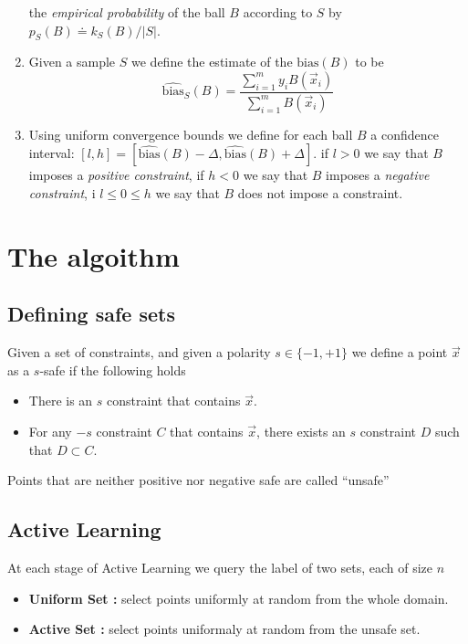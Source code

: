 \documentclass{article}
\newcommand{\x}{\vec{x}}
\newcommand{\bias}{\text{bias}}
\newcommand{\ebias}{\widehat{\text{bias}}}
\newcommand{\samp}{S}
\begin{document}
\begin{enumerate}
    the {\em empirical probability} of the ball $B$ according to
    $\samp$ by $p_{\samp}(B) \doteq k_{\samp}(B)/|\samp|$.
  \item Given a sample $\samp$ we define the estimate of the
    $\bias(B)$ to be
    \[
    \ebias_{\samp}(B) = \frac{\sum_{i=1}^m y_i B(\x_i)}{\sum_{i=1}^m B(\x_i)}
    \]
  \item Using uniform convergence bounds we define for each ball $B$
    a confidence interval:
    $[l,h]=[\ebias(B)-\Delta,\ebias(B)+\Delta]$.
    if $l>0$ we say that $B$ imposes a {\em positive constraint}, if
    $h<0$ we say that $B$ imposes a {\em negative constraint}, i
    $l\leq 0 \leq h$ we say that $B$ does not impose a constraint.
\end{enumerate}


\section{The algoithm}

\subsection{Defining safe sets}

Given a set of constraints, and given a polarity  $s \in
\{-1,+1\}$ we define a point $\x$ as a $s$-safe if
the following holds
\begin{itemize}
\item There is an $s$ constraint that contains $\x$.
\item For any $-s$ constraint $C$ that contains $\x$, there exists an
  $s$ constraint $D$ such that $D \subset C$. 
\end{itemize}

Points that are neither positive nor negative safe are called
``unsafe''

\subsection{Active Learning}

At each stage of Active Learning we query the label of two sets, each
of size $n$
\begin{itemize}
\item {\bf Uniform Set :} select points uniformly at random from the whole
  domain.
\item {\bf Active Set :} select points uniformaly at random from the unsafe
  set.
\end{itemize}
\end{document}
